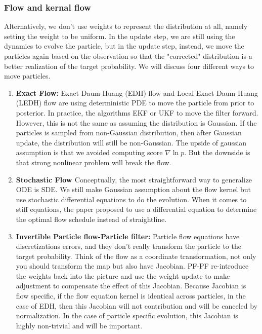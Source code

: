 \documentclass{article}
\begin{document}
\subsubsection{Flow and kernal flow}

Alternatively, we don't use weights to represent the distribution at all, namely setting the weight to be uniform. In the update step, we are still using the dynamics to evolve the particle, but in the update step, instead, we move the particles again based on the observation so that the "corrected" distribution is a better realization of the target probability. We will discuss four different ways to move particles. 

\begin{enumerate}
    \item \textbf{Exact Flow:} Exact Daum-Huang (EDH) flow and Local Exact Daum-Huang (LEDH) flow\cite{daum2010exact,daum2011particle,ding2012implementation} are using deterministic PDE to move the particle from prior to posterior. In practice, the algorithms EKF or UKF to move the filter forward. However, this is not the same as assuming the distribution is Gaussian. If the particles is sampled from non-Gaussian distribution, then after Gaussian update, the distribution will still be non-Gaussian. The upside of gaussian assumption is that we avoided computing score $\nabla \ln p$. But the downside is that strong nonlinear problem will break the flow. 
    
    \item \textbf{Stochastic Flow \cite{dai-new-2021}} Conceptually, the most straightforward way to generalize ODE is SDE. We still make Gaussian assumption about the flow kernel but use stochastic differential equations to do the evolution. When it comes to stiff equations, the paper \cite{dai-stiffness-mitigation-2021} proposed to use a differential equation to determine the optimal flow schedule instead of straightline. 



    
    \item \textbf{Invertible Particle flow-Particle filter:} Particle flow equations have discretizations errors, and they don't really transform the particle to the target probability. Think of the flow as a coordinate transformation, not only you should transform the map but also have Jacobian. PF-PF re-introduce the weights back into the picture and use the weight update to make adjustment to compensate the effect of this Jacobian. Because Jacobian is flow specific, if the flow equation kernel is identical across particles, in the case of EDH, then this Jacobian will not contribution and will be canceled by normalization. In the case of particle specific evolution, this Jacobian is highly non-trivial and will be important.
\end{enumerate}
\end{document}

